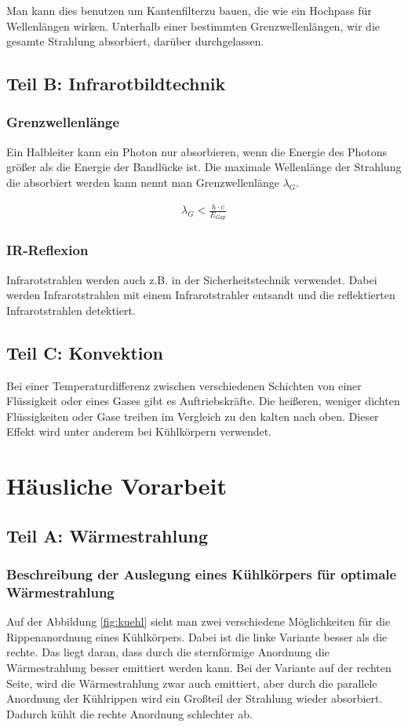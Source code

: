 \documentclass[a4paper]{scrartcl}
\numberwithin{equation}{subsection}
\begin{document}
Man kann dies benutzen um \glqq Kantenfilter\grqq zu bauen, die wie ein Hochpass für Wellenlängen wirken.
Unterhalb einer bestimmten Grenzwellenlängen, wir die gesamte Strahlung absorbiert, darüber durchgelassen.

\subsection{Teil B: Infrarotbildtechnik}
\subsubsection{Grenzwellenlänge}
Ein Halbleiter kann ein Photon nur absorbieren, wenn die Energie des Photons größer als die Energie der Bandlücke ist.
Die maximale Wellenlänge der Strahlung die absorbiert werden kann nennt man Grenzwellenlänge $\lambda_G$.

\begin{align}
\label{eq:grenz}
\lambda_G < \frac{h\cdot c}{E_{Gap}}
\end{align}

\subsubsection{IR-Reflexion}
Infrarotstrahlen werden auch z.B. in der Sicherheitstechnik verwendet.
Dabei werden Infrarotstrahlen mit einem Infrarotstrahler entsandt und die reflektierten Infrarotstrahlen detektiert.

\subsection{Teil C: Konvektion}
Bei einer Temperaturdifferenz zwischen verschiedenen Schichten von einer Flüssigkeit oder eines Gases gibt es Auftriebskräfte.
Die heißeren, weniger dichten Flüssigkeiten oder Gase treiben im Vergleich zu den kalten nach oben.
Dieser Effekt wird unter anderem bei Kühlkörpern verwendet.

\newpage
\section{Häusliche Vorarbeit}
\subsection{Teil A: Wärmestrahlung}
\subsubsection{Beschreibung der Auslegung eines Kühlkörpers für optimale Wärmestrahlung}
Auf der Abbildung \ref{fig:kuehl} sieht man zwei verschiedene Möglichkeiten für die Rippenanordnung eines Kühlkörpers.
Dabei ist die linke Variante besser als die rechte.
Das liegt daran, dass durch die sternförmige Anordnung die Wärmestrahlung besser emittiert werden kann.
Bei der Variante auf der rechten Seite, wird die Wärmestrahlung zwar auch emittiert, aber durch die parallele Anordnung der Kühlrippen wird ein Großteil der Strahlung wieder absorbiert.
Dadurch kühlt die rechte Anordnung schlechter ab.
\end{document}
